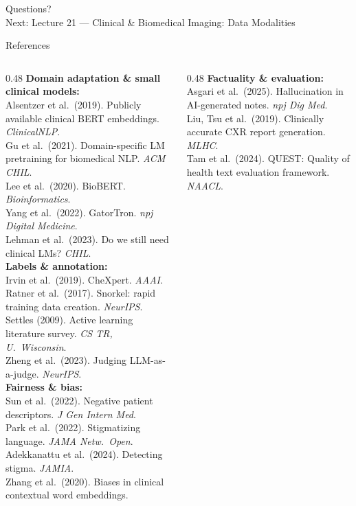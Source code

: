 \documentclass[aspectratio=169,11pt]{beamer}
\begin{document}
\begin{frame}[standout]
  Questions?\\[1em]
  {\small Next: Lecture 21 --- Clinical \& Biomedical Imaging: Data Modalities}
\end{frame}

\begin{frame}{References}
\tiny
\begin{columns}[T]
\begin{column}{0.48\textwidth}
\textbf{Domain adaptation \& small clinical models:}\\
Alsentzer et al.\ (2019). Publicly available clinical BERT embeddings. \textit{ClinicalNLP}.\\
Gu et al.\ (2021). Domain-specific LM pretraining for biomedical NLP. \textit{ACM CHIL}.\\
Lee et al.\ (2020). BioBERT. \textit{Bioinformatics}.\\
Yang et al.\ (2022). GatorTron. \textit{npj Digital Medicine}.\\
Lehman et al.\ (2023). Do we still need clinical LMs? \textit{CHIL}.\\[0.2em]

\textbf{Labels \& annotation:}\\
Irvin et al.\ (2019). CheXpert. \textit{AAAI}.\\
Ratner et al.\ (2017). Snorkel: rapid training data creation. \textit{NeurIPS}.\\
Settles (2009). Active learning literature survey. \textit{CS TR, U.\ Wisconsin}.\\
Zheng et al.\ (2023). Judging LLM-as-a-judge. \textit{NeurIPS}.\\[0.2em]

\textbf{Fairness \& bias:}\\
Sun et al.\ (2022). Negative patient descriptors. \textit{J Gen Intern Med}.\\
Park et al.\ (2022). Stigmatizing language. \textit{JAMA Netw.\ Open}.\\
Adekkanattu et al.\ (2024). Detecting stigma. \textit{JAMIA}.\\
Zhang et al.\ (2020). Biases in clinical contextual word embeddings.\\

\end{column}
\begin{column}{0.48\textwidth}
\textbf{Factuality \& evaluation:}\\
Asgari et al.\ (2025). Hallucination in AI-generated notes. \textit{npj Dig Med}.\\
Liu, Tsu et al.\ (2019). Clinically accurate CXR report generation. \textit{MLHC}.\\
Tam et al.\ (2024). QUEST: Quality of health text evaluation framework. \textit{NAACL}.\\[0.2em]


\end{column}
\end{columns}
\end{frame}
\end{document}
